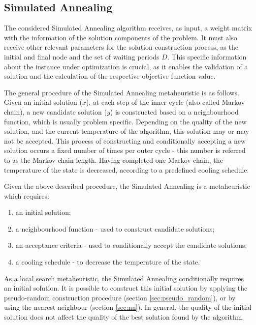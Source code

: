 \subsection{Simulated Annealing}
\label{sec:sa}

The considered Simulated Annealing algorithm receives, as input, a weight matrix with the information of the solution components of the problem. It must also receive other relevant parameters for the solution construction process, as the initial and final node and the set of waiting periods $D$. This specific information about the instance under optimization is crucial, as it enables the validation of a solution and the calculation of the respective objective function value.

The general procedure of the Simulated Annealing metaheuristic is as follows. Given an initial solution ($x$), at each step of the inner cycle (also called Markov chain), a new candidate solution ($y$) is constructed based on a neighbourhood function, which is usually problem specific. Depending on the quality of the new solution, and the current temperature of the algorithm, this solution may or may not be accepted. This process of constructing and conditionally accepting a new solution occurs a fixed number of times per outer cycle - this number is referred to as the Markov chain length. Having completed one Markov chain, the temperature of the state is decreased, according to a predefined cooling schedule.

Given the above described procedure, the Simulated Annealing is a metaheuristic which requires:
\begin{enumerate}
    \item an initial solution;
    \item a neighbourhood function - used to construct candidate solutions; 
    \item an acceptance criteria - used to conditionally accept the candidate solutions;
    \item a cooling schedule - to decrease the temperature of the state.
\end{enumerate}


As a local search metaheuristic, the Simulated Annealing conditionally requires an initial solution.  It is possible to construct this initial solution by applying the pseudo-random construction procedure (section \ref{sec:pseudo_random}), or by using the nearest neighbour (section \ref{sec:nn}). In general, the quality of the initial solution does not affect the quality of the best solution found by the algorithm. 

